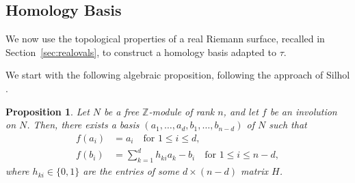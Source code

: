\documentclass[11pt,a4paper]{article}
\newtheorem{proposition}[theorem]{Proposition}
\theoremstyle{definition}
\newcommand{\Z}{\mathds{Z}}
\begin{document}
\subsection{Homology Basis}\label{sec:homology}

We now use the topological properties of a real Riemann surface, recalled in Section~\ref{sec:realovals}, to construct a homology basis adapted to $\tau$.

We start with the following algebraic proposition, following the approach of Silhol \cite{Sil98}.

\begin{proposition}\label{prop:freemodule}
	Let $N$ be a free $\Z$-module of rank $n$, and let $f$ be an involution on $N$. Then, there exists a basis $(a_1, \ldots, a_d, b_1, \ldots, b_{n-d})$ of $N$ such that
	\begin{align*}
		f(a_i) &= a_i \quad \text{for } 1 \leq i \leq d,\\
		f(b_i) &= \sum_{k=1}^d h_{ki} a_k - b_i \quad \text{for } 1 \leq i \leq n-d,
	\end{align*}
	where $h_{ki} \in \{0,1\}$ are the entries of some $d \times (n-d)$ matrix $H$.
\end{proposition}
\end{document}
